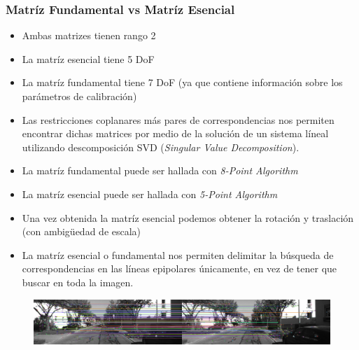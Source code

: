 \begin{frame}
    \frametitle{Matríz Fundamental vs Matríz Esencial}
    \footnotesize
    
    \begin{itemize}
        \item Ambas matrizes tienen rango 2
        \item La matríz esencial tiene 5 DoF
        \item La matríz fundamental tiene 7 DoF (ya que contiene información sobre los parámetros de calibración)
        \item Las restricciones coplanares más pares de correspondencias nos permiten encontrar dichas matrices por medio de la solución de un sistema líneal utilizando descomposición SVD (\emph{Singular Value Decomposition}).
        \item La matríz fundamental puede ser hallada con \emph{8-Point Algorithm}
        \item La matríz esencial puede ser hallada con \emph{5-Point Algorithm}
        \item Una vez obtenida la matríz esencial podemos obtener la rotación y traslación (con ambig{\"u}edad de escala)
        \item La matríz esencial o fundamental nos permiten delimitar la búsqueda de correspondencias en las líneas epipolares únicamente, en vez de tener que buscar en toda la imagen.
    \end{itemize}

    \begin{figure}
        \includegraphics[width=\textwidth]{./images/stereo_matches.pdf}
    \end{figure}
    
\end{frame}


